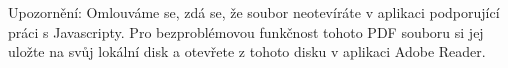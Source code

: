             Upozorn\v en\'i: Omlouváme se, zdá se, \v ze soubor neotevíráte v
            aplikaci podporující práci s Javascripty. Pro
            bezproblémovou funk\v cnost tohoto PDF souboru si jej ulo\v zte
            na sv\r uj lokální disk a otev\v rete z tohoto disku v aplikaci Adobe
            Reader.
